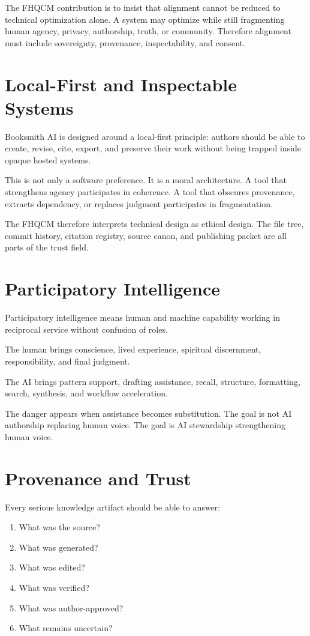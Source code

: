 The FHQCM contribution is to insist that alignment cannot be reduced to technical optimization alone. A system may optimize while still fragmenting human agency, privacy, authorship, truth, or community. Therefore alignment must include sovereignty, provenance, inspectability, and consent.

\section{Local-First and Inspectable Systems}

Booksmith AI is designed around a local-first principle: authors should be able to create, revise, cite, export, and preserve their work without being trapped inside opaque hosted systems.

This is not only a software preference. It is a moral architecture. A tool that strengthens agency participates in coherence. A tool that obscures provenance, extracts dependency, or replaces judgment participates in fragmentation.

The FHQCM therefore interprets technical design as ethical design. The file tree, commit history, citation registry, source canon, and publishing packet are all parts of the trust field.

\section{Participatory Intelligence}

Participatory intelligence means human and machine capability working in reciprocal service without confusion of roles.

The human brings conscience, lived experience, spiritual discernment, responsibility, and final judgment.

The AI brings pattern support, drafting assistance, recall, structure, formatting, search, synthesis, and workflow acceleration.

The danger appears when assistance becomes substitution. The goal is not AI authorship replacing human voice. The goal is AI stewardship strengthening human voice.

\section{Provenance and Trust}

Every serious knowledge artifact should be able to answer:

\begin{enumerate}
\item What was the source?
\item What was generated?
\item What was edited?
\item What was verified?
\item What was author-approved?
\item What remains uncertain?
\end{enumerate}

